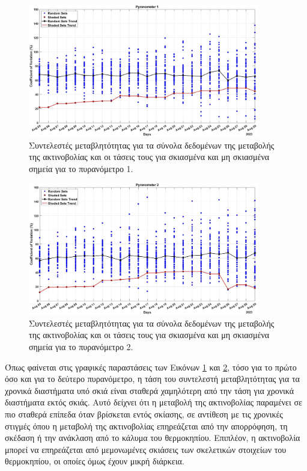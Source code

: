 \documentclass[12pt, a4paper]{report} %
\begin{document}
\begin{figure}[H]%
    \centering
    \includegraphics[width=0.9\textwidth]{Figures/cv_1.jpg}
    \caption{Συντελεστές μεταβλητότητας για τα σύνολα δεδομένων της μεταβολής της ακτινοβολίας και οι τάσεις τους για σκιασμένα και μη σκιασμένα σημεία για το πυρανόμετρο 1.}
    \label{fig_cv_1}
\end{figure}

\begin{figure}[H]%
    \centering
    \includegraphics[width=0.9\textwidth]{Figures/cv_2.jpg}
    \caption{Συντελεστές μεταβλητότητας για τα σύνολα δεδομένων της μεταβολής της ακτινοβολίας και οι τάσεις τους για σκιασμένα και μη σκιασμένα σημεία για το πυρανόμετρο 2.}
    \label{fig_cv_2}
\end{figure}

Όπως φαίνεται στις γραφικές παραστάσεις των Εικόνων \ref{fig_cv_1} και \ref{fig_cv_2}, τόσο για το πρώτο όσο και για 
το δεύτερο πυρανόμετρο, η τάση του συντελεστή μεταβλητότητας για τα χρονικά διαστήματα υπό σκιά είναι σταθερά χαμηλότερη 
από την τάση για χρονικά διαστήματα εκτός σκιάς. Αυτό δείχνει ότι η μεταβολή της ακτινοβολίας παραμένει σε πιο σταθερά 
επίπεδα όταν βρίσκεται εντός σκίασης, σε αντίθεση με τις χρονικές στιγμές όπου η μεταβολή της ακτινοβολίας επηρεάζεται 
από την απορρόφηση, τη σκέδαση ή την ανάκλαση από το κάλυμα του θερμοκηπίου. Επιπλέον, η ακτινοβολία μπορεί να 
επηρεάζεται από μεμονωμένες σκιάσεις των σκελετικών στοιχείων του θερμοκηπίου, οι οποίες όμως έχουν μικρή διάρκεια.
\end{document}
